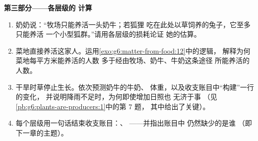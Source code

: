 \begin{problem}
\medskip\noindent\textbf{第三部分——各层级的
计算}
\begin{enumerate}[resume]
  \item 奶奶说：“牧场只能养活一头奶牛；若狐狸
        吃在此处以草饲养的兔子，它至多只能养活
        一个小型狐群。”请用各层级的损耗论证
        她的估算。
  \item 菜地直接养活这家人。运用\cref{exo:g6:matter-from-food:12}中的逻辑，
        解释为何菜地每平方米能养活的人数
        多于经由牧场、奶牛、牛奶这条途径
        所能养活的人数。
  \item 干旱时草停止生长。依次预测奶牛的牛奶、
        体重，以及收支账目中“构建”一行的变化，
        并说明降雨不足时，为何即使增加日照也
        无济于事
        （见\cref{pb:g6:plants-are-producers:1}中的第 7 题，
        其中给出了关键）。
  \item 每个层级用一句话结束收支账目：、
        ——并指出账目中
        仍然缺少的是谁
        （即下一章的主题）。
\end{enumerate}
\end{problem}

